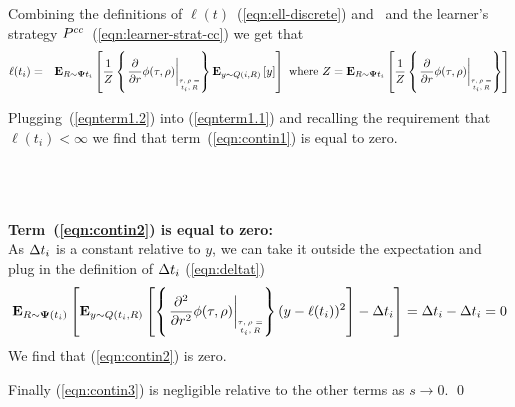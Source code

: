 \documentclass{article}[12pt]
\begin{document}
Combining the definitions of $\ell(t)$~(\ref{eqn:ell-discrete}) and~
and the learner's strategy
$P^{cc}$~(\ref{eqn:learner-strat-cc}) we get that
\begin{eqnarray}
\ell(t_i) &=& \E{\R \sim \state{t_i}}{\frac{1}{Z}
              \at{\frac{\partial}{\partial r}}
              \E{y \sim \adversM(i,\R)}{y}} \mbox{ where }
              Z=\E{\R \sim \state{t_i}}{\frac{1}{Z}
              \at{\frac{\partial}{\partial r}}}
              \label{eqnterm1.2}
\end{eqnarray}

Plugging~(\ref{eqnterm1.2}) into (\ref{eqnterm1.1}) and recalling the
requirement that $\ell(t_i)<\infty$ we find that
term~(\ref{eqn:contin1}) is equal to zero.


~\\~\\~\\
{\bf Term~(\ref{eqn:contin2}) is equal to zero:}\\
As $\Delta t_i$ is a constant relative to $y$, we can take it
outside the expectation and plug in the definition of $\Delta t_i$ (\ref{eqn:deltat})
\begin{equation} \label{eqn:term2.1}
  \E{\R \sim \state(t_i)}{\E{y \sim
      \adversM(t_i,\R)}{\at{\frac{\partial^2}{\partial r^2}}
      (y-\ell(t_i))^2} - \deltat_i}=
  \deltat_i - \deltat_i =0
\end{equation}
We find that (\ref{eqn:contin2}) is zero.

Finally (\ref{eqn:contin3}) is negligible relative to the other terms
as $s \to 0$.
\qed 
\end{document}

